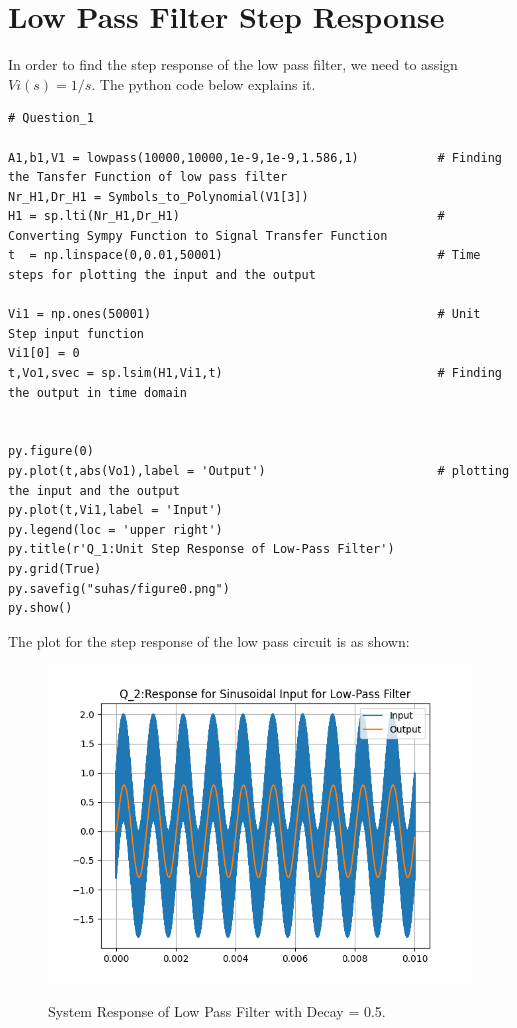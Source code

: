\documentclass[11pt, a4paper]{article}
\begin{document}
\section*{Low Pass Filter Step Response}
In order to find the step response of the low pass filter, we need to assign $ Vi(s) = 1/s $. 
The python code below explains it. 
\begin{verbatim}
# Question_1

A1,b1,V1 = lowpass(10000,10000,1e-9,1e-9,1.586,1)           # Finding the Tansfer Function of low pass filter
Nr_H1,Dr_H1 = Symbols_to_Polynomial(V1[3])
H1 = sp.lti(Nr_H1,Dr_H1)                                    # Converting Sympy Function to Signal Transfer Function
t  = np.linspace(0,0.01,50001)                              # Time steps for plotting the input and the output

Vi1 = np.ones(50001)                                        # Unit Step input function
Vi1[0] = 0
t,Vo1,svec = sp.lsim(H1,Vi1,t)                              # Finding the output in time domain

                   
py.figure(0)                                                 
py.plot(t,abs(Vo1),label = 'Output')                        # plotting the input and the output  
py.plot(t,Vi1,label = 'Input')                            
py.legend(loc = 'upper right')
py.title(r'Q_1:Unit Step Response of Low-Pass Filter')
py.grid(True)
py.savefig("suhas/figure0.png")
py.show()

\end{verbatim}
The plot for the step response of the low pass circuit is as shown:
\begin{figure}[!tbh]
   	\centering
   	\includegraphics[width=1.0\textwidth]{Figure1.png}
   	\label{fig:32}
   	\caption{System Response of Low Pass Filter with Decay = 0.5.}
   \end{figure}
\end{document}
